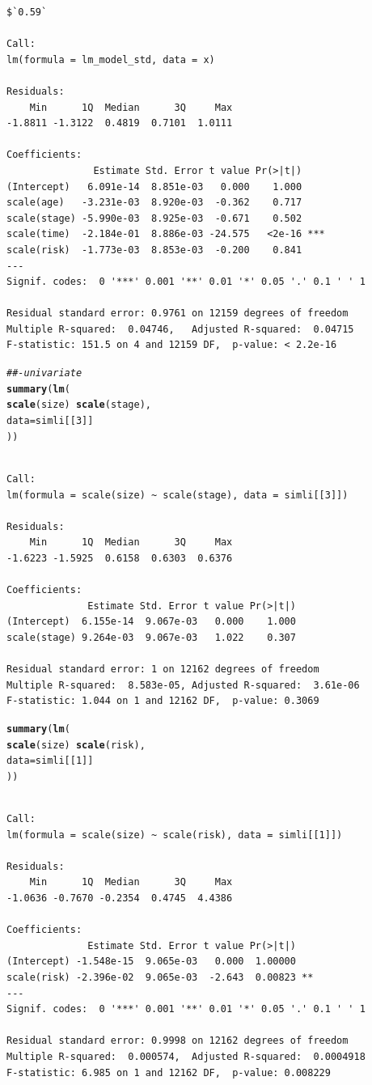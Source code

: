\documentclass[]{revtex4}\usepackage[]{graphicx}\usepackage[]{color}
\makeatletter
\newcommand{\hlnum}[1]{\textcolor[rgb]{0.686,0.059,0.569}{#1}}%
\newcommand{\hlcom}[1]{\textcolor[rgb]{0.678,0.584,0.686}{\textit{#1}}}%
\newcommand{\hlopt}[1]{\textcolor[rgb]{0,0,0}{#1}}%
\newcommand{\hlstd}[1]{\textcolor[rgb]{0.345,0.345,0.345}{#1}}%
\newcommand{\hlkwc}[1]{\textcolor[rgb]{0.333,0.667,0.333}{#1}}%
\newcommand{\hlkwd}[1]{\textcolor[rgb]{0.737,0.353,0.396}{\textbf{#1}}}%
\newenvironment{kframe}{%
 \def\at@end@of@kframe{}%
 \ifinner\ifhmode%
  \def\at@end@of@kframe{\end{minipage}}%
  \begin{minipage}{\columnwidth}%
 \fi\fi%
 \def\FrameCommand##1{\hskip\@totalleftmargin \hskip-\fboxsep
 \colorbox{shadecolor}{##1}\hskip-\fboxsep
     \hskip-\linewidth \hskip-\@totalleftmargin \hskip\columnwidth}%
 \MakeFramed {\advance\hsize-\width
   \@totalleftmargin\z@ \linewidth\hsize
   \@setminipage}}%
 {\par\unskip\endMakeFramed%
 \at@end@of@kframe}
\newenvironment{knitrout}{}{} %
\makeatother
\begin{document}
\begin{knitrout}
\begin{kframe}
\begin{verbatim}
$`0.59`

Call:
lm(formula = lm_model_std, data = x)

Residuals:
    Min      1Q  Median      3Q     Max 
-1.8811 -1.3122  0.4819  0.7101  1.0111 

Coefficients:
               Estimate Std. Error t value Pr(>|t|)    
(Intercept)   6.091e-14  8.851e-03   0.000    1.000    
scale(age)   -3.231e-03  8.920e-03  -0.362    0.717    
scale(stage) -5.990e-03  8.925e-03  -0.671    0.502    
scale(time)  -2.184e-01  8.886e-03 -24.575   <2e-16 ***
scale(risk)  -1.773e-03  8.853e-03  -0.200    0.841    
---
Signif. codes:  0 '***' 0.001 '**' 0.01 '*' 0.05 '.' 0.1 ' ' 1

Residual standard error: 0.9761 on 12159 degrees of freedom
Multiple R-squared:  0.04746,	Adjusted R-squared:  0.04715 
F-statistic: 151.5 on 4 and 12159 DF,  p-value: < 2.2e-16
\end{verbatim}
\begin{alltt}
\hlcom{##- univariate}
\hlkwd{summary}\hlstd{(}\hlkwd{lm}\hlstd{(}
  \hlkwd{scale}\hlstd{(size)} \hlopt{~} \hlkwd{scale}\hlstd{(stage),}
  \hlkwc{data} \hlstd{= simli[[}\hlnum{3}\hlstd{]]}
\hlstd{))}
\end{alltt}
\begin{verbatim}

Call:
lm(formula = scale(size) ~ scale(stage), data = simli[[3]])

Residuals:
    Min      1Q  Median      3Q     Max 
-1.6223 -1.5925  0.6158  0.6303  0.6376 

Coefficients:
              Estimate Std. Error t value Pr(>|t|)
(Intercept)  6.155e-14  9.067e-03   0.000    1.000
scale(stage) 9.264e-03  9.067e-03   1.022    0.307

Residual standard error: 1 on 12162 degrees of freedom
Multiple R-squared:  8.583e-05,	Adjusted R-squared:  3.61e-06 
F-statistic: 1.044 on 1 and 12162 DF,  p-value: 0.3069
\end{verbatim}
\begin{alltt}
\hlkwd{summary}\hlstd{(}\hlkwd{lm}\hlstd{(}
  \hlkwd{scale}\hlstd{(size)} \hlopt{~} \hlkwd{scale}\hlstd{(risk),}
  \hlkwc{data} \hlstd{= simli[[}\hlnum{1}\hlstd{]]}
\hlstd{))}
\end{alltt}
\begin{verbatim}

Call:
lm(formula = scale(size) ~ scale(risk), data = simli[[1]])

Residuals:
    Min      1Q  Median      3Q     Max 
-1.0636 -0.7670 -0.2354  0.4745  4.4386 

Coefficients:
              Estimate Std. Error t value Pr(>|t|)   
(Intercept) -1.548e-15  9.065e-03   0.000  1.00000   
scale(risk) -2.396e-02  9.065e-03  -2.643  0.00823 **
---
Signif. codes:  0 '***' 0.001 '**' 0.01 '*' 0.05 '.' 0.1 ' ' 1

Residual standard error: 0.9998 on 12162 degrees of freedom
Multiple R-squared:  0.000574,	Adjusted R-squared:  0.0004918 
F-statistic: 6.985 on 1 and 12162 DF,  p-value: 0.008229
\end{verbatim}
\end{kframe}
\end{knitrout}
\end{document}
